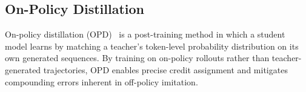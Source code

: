 


\subsection{On-Policy Distillation} \label{sec:pre_opd}




On-policy distillation (OPD)~\cite{agarwal2024policy} is a post-training method in which a student model learns by matching a teacher's token-level probability distribution on its own generated sequences. By training on on-policy rollouts rather than teacher-generated trajectories, OPD enables precise credit assignment and mitigates compounding errors inherent in off-policy imitation.

